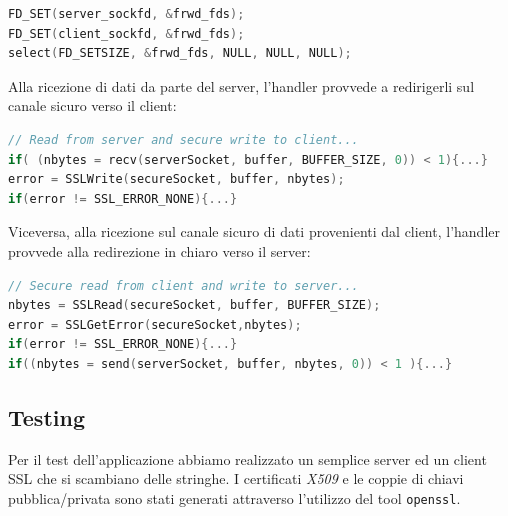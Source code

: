 \documentclass[10pt]{article}  %
\begin{document}
        \begin{lstlisting}[language=C]
FD_SET(server_sockfd, &frwd_fds);
FD_SET(client_sockfd, &frwd_fds);
select(FD_SETSIZE, &frwd_fds, NULL, NULL, NULL);
        \end{lstlisting}
        Alla ricezione di dati da parte del server, l'handler provvede a redirigerli
        sul canale sicuro verso il client:
        \begin{lstlisting}[language=C]
// Read from server and secure write to client...
if( (nbytes = recv(serverSocket, buffer, BUFFER_SIZE, 0)) < 1){...}
error = SSLWrite(secureSocket, buffer, nbytes);
if(error != SSL_ERROR_NONE){...}
        \end{lstlisting}
        Viceversa, alla ricezione sul canale sicuro di dati provenienti dal client,
        l'handler provvede alla redirezione in chiaro verso il server:
        \begin{lstlisting}[language=C]
// Secure read from client and write to server...
nbytes = SSLRead(secureSocket, buffer, BUFFER_SIZE);
error = SSLGetError(secureSocket,nbytes);
if(error != SSL_ERROR_NONE){...}
if((nbytes = send(serverSocket, buffer, nbytes, 0)) < 1 ){...}
        \end{lstlisting}
    \subsection{Testing}
        Per il test dell'applicazione abbiamo realizzato un semplice server
        ed un client SSL che si scambiano delle stringhe.
        I certificati \emph{X509} e le coppie di chiavi pubblica/privata sono
        stati generati attraverso l'utilizzo del tool \texttt{openssl}.
\end{document}
